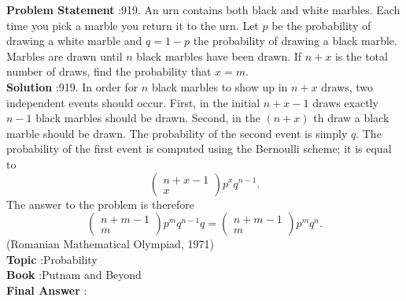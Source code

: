 \documentclass[10pt]{article}
\begin{document}
\textbf{Problem Statement} :919. An urn contains both black and white marbles. Each time you pick a marble you return it to the urn. Let $p$ be the probability of drawing a white marble and $q=1-p$ the probability of drawing a black marble. Marbles are drawn until $n$ black marbles have been drawn. If $n+x$ is the total number of draws, find the probability that $x=m$.\\
\textbf{Solution} :919. In order for $n$ black marbles to show up in $n+x$ draws, two independent events should occur. First, in the initial $n+x-1$ draws exactly $n-1$ black marbles should be drawn. Second, in the $(n+x)$ th draw a black marble should be drawn. The probability of the second event is simply $q$. The probability of the first event is computed using the Bernoulli scheme; it is equal to$$ \left(\begin{array}{c} n+x-1 \\ x \end{array}\right) p^{x} q^{n-1} . $$The answer to the problem is therefore$$ \left(\begin{array}{c} n+m-1 \\ m \end{array}\right) p^{m} q^{n-1} q=\left(\begin{array}{c} n+m-1 \\ m \end{array}\right) p^{m} q^{n} . $$(Romanian Mathematical Olympiad, 1971)\\
\textbf{Topic} :Probability\\
\textbf{Book} :Putnam and Beyond\\
\textbf{Final Answer} :\\
\end{document}
